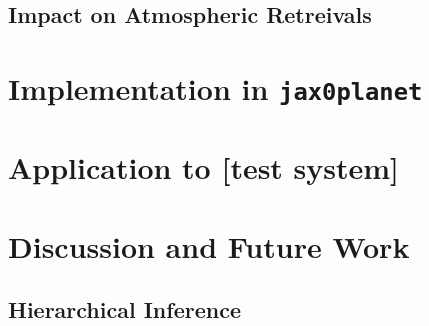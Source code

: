 \documentclass[twocolumn]{aastex631}
\begin{document}
\subsection{Impact on Atmospheric Retreivals}
\section{Implementation in \lowercase{\texttt{jax0planet}}}
\label{sec:jax0planet}
\section{Application to [test system]}
\label{sec:lctest}
\section{Discussion and Future Work}
\label{disc}
\subsection{Hierarchical Inference}

\end{document}
